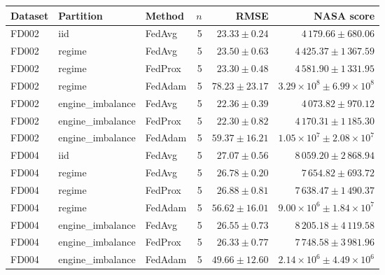 \begin{tabular}{lllrrr}
\toprule
Dataset & Partition & Method & $n$ & RMSE & NASA score \\
\midrule
FD002 & iid & FedAvg & 5 & $23.33\pm0.24$ & $4\,179.66\pm680.06$ \\
FD002 & regime & FedAvg & 5 & $23.50\pm0.63$ & $4\,425.37\pm1\,367.59$ \\
FD002 & regime & FedProx & 5 & $23.30\pm0.48$ & $4\,581.90\pm1\,331.95$ \\
FD002 & regime & FedAdam & 5 & $78.23\pm23.17$ & $3.29\times10^{8}\pm6.99\times10^{8}$ \\
FD002 & engine\_imbalance & FedAvg & 5 & $22.36\pm0.39$ & $4\,073.82\pm970.12$ \\
FD002 & engine\_imbalance & FedProx & 5 & $22.30\pm0.82$ & $4\,170.31\pm1\,185.30$ \\
FD002 & engine\_imbalance & FedAdam & 5 & $59.37\pm16.21$ & $1.05\times10^{7}\pm2.08\times10^{7}$ \\
FD004 & iid & FedAvg & 5 & $27.07\pm0.56$ & $8\,059.20\pm2\,868.94$ \\
FD004 & regime & FedAvg & 5 & $26.78\pm0.20$ & $7\,654.82\pm693.72$ \\
FD004 & regime & FedProx & 5 & $26.88\pm0.81$ & $7\,638.47\pm1\,490.37$ \\
FD004 & regime & FedAdam & 5 & $56.62\pm16.01$ & $9.00\times10^{6}\pm1.84\times10^{7}$ \\
FD004 & engine\_imbalance & FedAvg & 5 & $26.55\pm0.73$ & $8\,205.18\pm4\,119.58$ \\
FD004 & engine\_imbalance & FedProx & 5 & $26.33\pm0.77$ & $7\,748.58\pm3\,981.96$ \\
FD004 & engine\_imbalance & FedAdam & 5 & $49.66\pm12.60$ & $2.14\times10^{6}\pm4.49\times10^{6}$ \\
\bottomrule
\end{tabular}
